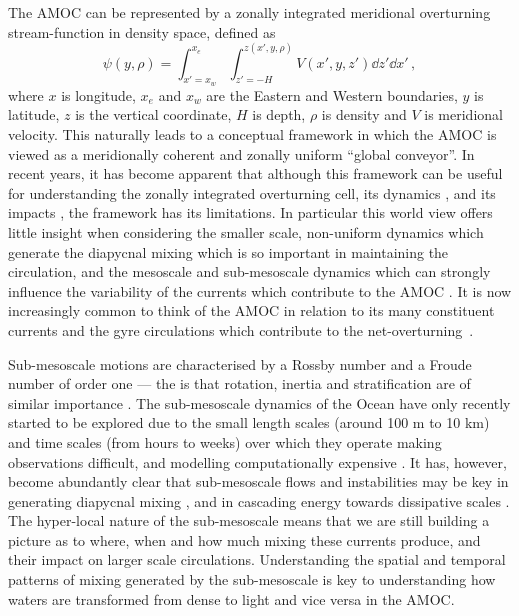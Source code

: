 The AMOC can be represented by a zonally integrated meridional overturning stream-function in density space, defined as
\begin{equation}
    \psi(y, \rho) = \int_{x' = x_w}^{x_e} \int_{z' = -H}^{z(x', y, \rho)} V(x', y, z') \dd{z'} \dd{x'} \, ,
\end{equation}
where $x$ is longitude, $x_e$ and $x_w$ are the Eastern and Western boundaries, $y$ is latitude, $z$ is the vertical coordinate, $H$ is depth, $\rho$ is density and $V$ is meridional velocity. This naturally leads to a conceptual framework in which the AMOC is viewed as a meridionally coherent and zonally uniform ``global conveyor''. In recent years, it has become apparent that although this framework can be useful for understanding the zonally integrated overturning cell, its dynamics \citep{Weijer2019}, and its impacts \citep{Zhang2019, Little2019}, the framework has its limitations. In particular this world view offers little insight when considering the smaller scale, non-uniform dynamics which generate the diapycnal mixing which is so important in maintaining the circulation, and the mesoscale and sub-mesoscale dynamics which can strongly influence the variability of the currents which contribute to the AMOC \citep[e.g.][]{Thomas2013}. It is now increasingly common to think of the AMOC in relation to its many constituent currents and the gyre circulations which contribute to the net-overturning~\citep{Bower2019}.

Sub-mesoscale motions are characterised by a Rossby number and a Froude number of order one --- the is that rotation, inertia and stratification are of similar importance \citep{Gula2022, McWilliams2016, Thomas2008}. The sub-mesoscale dynamics of the Ocean have only recently started to be explored due to the small length scales (around 100 m to 10 km) and time scales (from hours to weeks) over which they operate making observations difficult, and modelling computationally expensive \citep{Thomas2008}. It has, however, become abundantly clear that sub-mesoscale flows and instabilities may be key in generating diapycnal mixing \citep{Gula2022}, and in cascading energy towards dissipative scales \citep{Muller2005, Callies2013}. The hyper-local nature of the sub-mesoscale means that we are still building a picture as to where, when and how much mixing these currents produce, and their impact on larger scale circulations. Understanding the spatial and temporal patterns of mixing generated by the sub-mesoscale is key to understanding how waters are transformed from dense to light and vice versa in the AMOC.

